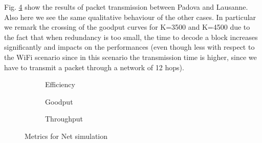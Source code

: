 Fig. \ref{fig:net} show the results of packet transmission between Padova and Lausanne. Also here we see the same qualitative behaviour of the other cases. In particular we remark the crossing of the goodput curves for K=3500 and K=4500 due to the fact that when redundancy is too small, the time to decode a block increases significantly and impacts on the performances (even though less with respect to the WiFi scenario since in this scenario the transmission time is higher, since we have to transmit a packet through a network of 12 hops).
\begin{figure}[t]
\centering
\begin{subfigure}{0.23\textwidth}
	\captionsetup{justification=centering,font=scriptsize}
	\centering
	\setlength\fwidth{\textwidth}
	\setlength{}
	
	\caption{Efficiency}
	\label{fig:net_eff}
\end{subfigure}\hspace{2em}%
\begin{subfigure}{0.23\textwidth}
	\captionsetup{justification=centering,font=scriptsize}
	\centering
	\setlength\fwidth{\textwidth}
	\setlength{}
	
	\caption{Goodput}
	\label{fig:net_good}
\end{subfigure}\hspace{2em}%
\begin{subfigure}{0.23\textwidth}
	\captionsetup{justification=centering,font=scriptsize}
	\centering
	\setlength\fwidth{\textwidth}
	\setlength{}
	
	\caption{Throughput}
	\label{fig:net_thr}
\end{subfigure}
\caption{Metrics for Net simulation}
\label{fig:net}
\end{figure}


